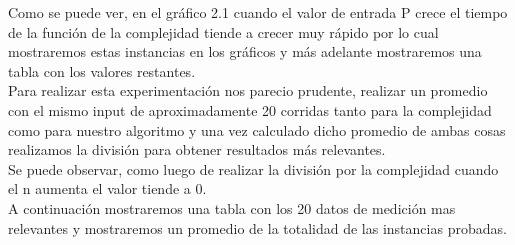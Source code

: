 Como se puede ver, en el gr\'afico 2.1 cuando el valor de entrada P crece el tiempo de la funci\'on de la complejidad tiende a crecer muy r\'apido por lo cual mostraremos estas instancias en los gr\'aficos y m\'as adelante mostraremos una tabla con los valores restantes.\\

Para realizar esta experimentaci\'on nos parecio prudente, realizar un promedio con el mismo input de aproximadamente 20 corridas
tanto para la complejidad como para nuestro algoritmo y una vez calculado dicho promedio de ambas cosas realizamos la divisi\'on para
obtener resultados m\'as relevantes.\\ 

Se puede observar, como luego de realizar la divisi\'on por la complejidad cuando el n aumenta el valor tiende a 0.\\

A continuaci\'on mostraremos una tabla  con los 20 datos de medici\'on mas relevantes  y mostraremos un promedio de la totalidad de las instancias probadas.\\

